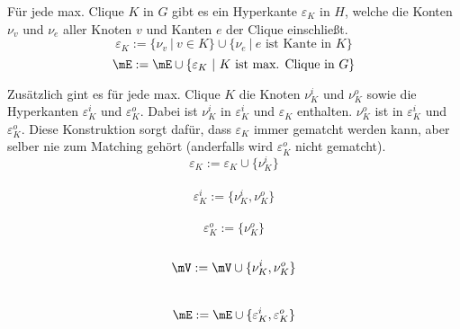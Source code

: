 Für jede max. Clique $K$ in $G$ gibt es ein Hyperkante $\varepsilon_K$ in $H$, welche die Konten $\nu_v$ und $\nu_e$ aller Knoten $v$ und Kanten $e$ der Clique einschließt. $$\varepsilon_K := \{\nu_v\ |\ v \in K\} \cup \{\nu_e\ |\ \text{$e$ ist Kante in $K$}\}$$ $$\mE:=\mE\cup \{\varepsilon_K\ |\ \text{$K$ ist max. Clique in $G$} \}$$

Zusätzlich gint es für jede max. Clique $K$ die Knoten $\nu_K^i$ und $\nu_K^o$ sowie die Hyperkanten $\varepsilon_K^i$ und $\varepsilon_K^o$. Dabei ist $\nu_K^i$ in $\varepsilon_K^i$ und $\varepsilon_K$ enthalten. $\nu_K^o$ ist in $\varepsilon_K^i$ und $\varepsilon_K^o$. Diese Konstruktion sorgt dafür, dass $\varepsilon_K$ immer gematcht werden kann, aber selber nie zum Matching gehört (anderfalls wird $\varepsilon_K^o$ nicht gematcht).
$$\varepsilon_K:=\varepsilon_K\cup\{\nu_K^i\}$$ \\
$$\varepsilon_K^i:=\{\nu_K^i,\nu_K^o\}$$ \\
$$\varepsilon_K^o:=\{\nu_K^o\}$$ \\
$$\mV:=\mV\cup \{\nu_K^i,\nu_K^o\}$$ \\
$$\mE:=\mE\cup\{\varepsilon_K^i,\varepsilon_K^o\}$$


